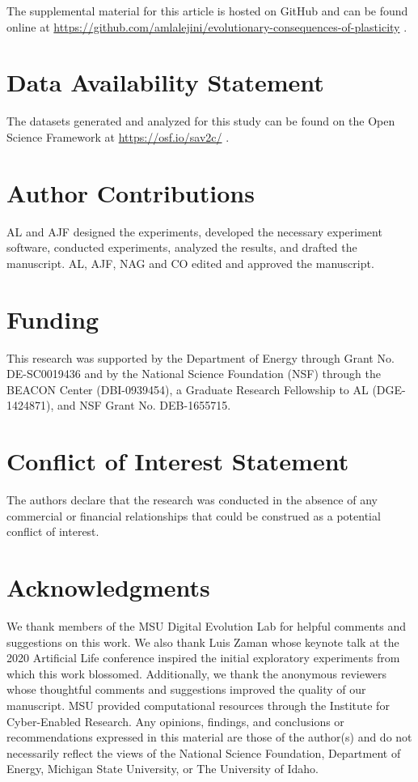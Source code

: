 \documentclass[utf8]{frontiersSCNS} %
\begin{document}
The supplemental material for this article is hosted on GitHub and can be found online at \url{https://github.com/amlalejini/evolutionary-consequences-of-plasticity} \citep{supplemental_material}.

\section*{Data Availability Statement}

The datasets generated and analyzed for this study can be found on the Open Science Framework at \url{https://osf.io/sav2c/} \citep{osf_data}.

\section*{Author Contributions}

AL and AJF designed the experiments, developed the necessary experiment software, conducted experiments, analyzed the results, and drafted the manuscript.
AL, AJF, NAG and CO edited and approved the manuscript.

\section*{Funding}

This research was supported by the Department of Energy through Grant No. DE-SC0019436 and by the National Science Foundation (NSF) through the BEACON Center (DBI-0939454), a Graduate Research Fellowship to AL (DGE-1424871), and NSF Grant No. DEB-1655715.

\section*{Conflict of Interest Statement}

The authors declare that the research was conducted in the absence of any commercial or financial relationships that could be construed as a potential conflict of interest.

\section*{Acknowledgments}

We thank members of the MSU Digital Evolution Lab for helpful comments and suggestions on this work.
We also thank Luis Zaman whose keynote talk at the 2020 Artificial Life conference inspired the initial exploratory experiments from which this work blossomed.
Additionally, we thank the anonymous reviewers whose thoughtful comments and suggestions improved the quality of our manuscript.
MSU provided computational resources through the Institute for Cyber-Enabled Research.
Any opinions, findings, and conclusions or recommendations expressed in this material are those of the author(s) and do not necessarily reflect the views of the National Science Foundation, Department of Energy, Michigan State University, or The University of Idaho.



\end{document}

